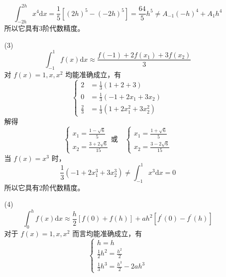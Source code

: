 \documentclass{sjtuarticle}
\def\dd{\mathrm{d}}
\begin{document}
\begin{itemize}
\begin{solution}
\begin{itemize}
\begin{equation*}
            \int_{-2h}^{2h}x^4\dd x=\frac{1}{5}[(2h)^5-(-2h)^5]=\frac{64}{5}h^5\neq A_{-1}(-h)^4+A_1h^4
        \end{equation*}
        所以它具有3阶代数精度。
        \item[(3)]
        \begin{equation*}
            \int_{-1}^1 f(x)\dd x\approx \frac{f(-1)+2f(x_1)+3f(x_2)}{3}
        \end{equation*}
        对 $f(x)=1,x,x^2$ 均能准确成立，有
        \begin{equation*}
            \left\{
                \begin{aligned}
                2 &= \frac{1}{3}(1+2+3) \\
                0 &= \frac{1}{3}(-1+2x_1+3x_2) \\
                \frac{2}{3} &= \frac{1}{3}(1+2x_1^2+3x_2^2)
                \end{aligned}
            \right.
        \end{equation*}
        解得
        \begin{equation*}
            \begin{cases}
                x_1=\frac{1-\sqrt{6}}{5}\\
                x_2=\frac{3+2\sqrt{6}}{15}
            \end{cases}\text{或}\quad
            \begin{cases}
                x_1=\frac{1+\sqrt{6}}{5}\\
                x_2=\frac{3-2\sqrt{6}}{15}
            \end{cases}
        \end{equation*}
        当 $f(x)=x^3$ 时，
        \begin{equation*}
            \frac{1}{3}(-1+2x_1^3+3x_2^3)\neq \int_{-1}^1 x^3\dd x=0
        \end{equation*}
        所以它具有2阶代数精度。
        \item[(4)]
        \begin{equation*}
            \int_{0}^h f(x)\dd x\approx \frac{h}{2}[f(0)+f(h)]+ah^2[f^\prime(0)-f^\prime(h)] 
        \end{equation*}
        对于 $f(x)=1, x, x^2$ 而言均能准确成立，有
        \begin{equation*}
            \begin{cases}
                h = h \\
                \frac{1}{2}h^2 = \frac{h^2}{2} \\
                \frac{1}{3}h^3 = \frac{h^3}{2}-2ah^3

\end{cases}
\end{equation*}
\end{itemize}
\end{solution}
\end{itemize}
\end{document}

